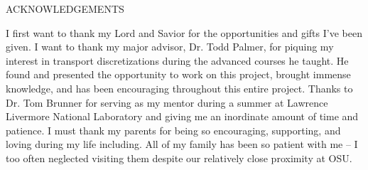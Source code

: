 \documentclass[12pt]{article}
\begin{document}
\begin{center}
ACKNOWLEDGEMENTS
\end{center}

{\color{blue}
I first want to thank my Lord and Savior for the opportunities and gifts I've been given. I want to thank my major advisor, Dr. Todd Palmer, for piquing my interest in transport discretizations during the advanced courses he taught. He found and presented the opportunity to work on this project, brought immense knowledge, and has been encouraging throughout this entire project. Thanks to Dr. Tom Brunner for serving as my mentor during a summer at Lawrence Livermore National Laboratory and giving me an inordinate amount of time and patience. I must thank my parents for being so encouraging, supporting, and loving during my life including. All of my family has been so patient with me -- I too often neglected visiting them despite our relatively close proximity at OSU.
}
\end{document}
